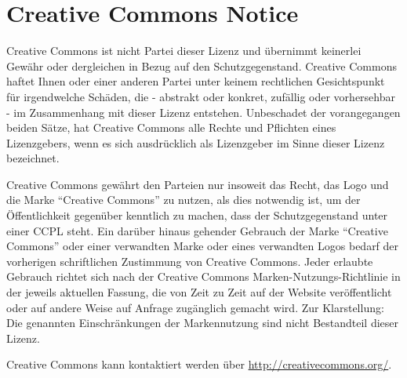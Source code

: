 \section{Creative Commons Notice}

Creative Commons ist nicht Partei dieser Lizenz und übernimmt keinerlei Gewähr oder dergleichen in Bezug auf den Schutzgegenstand. Creative Commons haftet Ihnen oder einer anderen Partei unter keinem rechtlichen Gesichtspunkt für irgendwelche Schäden, die - abstrakt oder konkret, zufällig oder vorhersehbar - im Zusammenhang mit dieser Lizenz entstehen. Unbeschadet der vorangegangen beiden Sätze, hat Creative Commons alle Rechte und Pflichten eines Lizenzgebers, wenn es sich ausdrücklich als Lizenzgeber im Sinne dieser Lizenz bezeichnet.

Creative Commons gewährt den Parteien nur insoweit das Recht, das Logo und die Marke ``Creative Commons'' zu nutzen, als dies notwendig ist, um der Öffentlichkeit gegenüber kenntlich zu machen, dass der Schutzgegenstand unter einer CCPL steht. Ein darüber hinaus gehender Gebrauch der Marke ``Creative Commons'' oder einer verwandten Marke oder eines verwandten Logos bedarf der vorherigen schriftlichen Zustimmung von Creative Commons. Jeder erlaubte Gebrauch richtet sich nach der Creative Commons Marken-Nutzungs-Richtlinie in der jeweils aktuellen Fassung, die von Zeit zu Zeit auf der Website veröffentlicht oder auf andere Weise auf Anfrage zugänglich gemacht wird. Zur Klarstellung: Die genannten Einschränkungen der Markennutzung sind nicht Bestandteil dieser Lizenz.

Creative Commons kann kontaktiert werden über \url{http://creativecommons.org/}.
